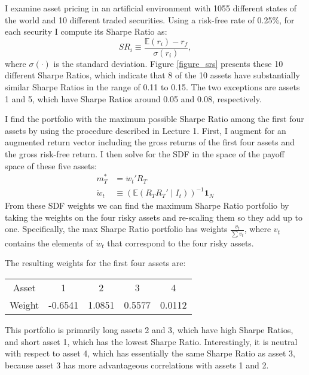 \documentclass[12pt]{article}
\newcommand{\E}{\mathbb{E}}
\begin{document}
\clearpage
{}


I examine asset pricing in an artificial environment with 1055 different states of the world and 10 different traded securities. Using a risk-free rate of 0.25\%, for each security I compute its Sharpe Ratio as:
$$SR_i \equiv \frac{\E(r_i) - r_f}{\sigma(r_i)},$$
where $\sigma(\cdot)$ is the standard deviation. Figure \ref{figure_srs} presents these 10 different Sharpe Ratios, which indicate that 8 of the 10 assets have substantially similar Sharpe Ratios in the range of 0.11 to 0.15. The two exceptions are assets 1 and 5, which have Sharpe Ratios around 0.05 and 0.08, respectively.


I find the portfolio with the maximum possible Sharpe Ratio among the first four assets by using the procedure described in Lecture 1. First, I augment for an augmented return vector including the gross returns of the first four assets and the gross risk-free return. I then solve for the SDF in the space of the payoff space of these five assets:
\begin{align*}
m_T^* &= \dot{w}_t' R_T \\
\dot{w}_t &\equiv \left( \mathbb{E} \left( R_T R_T' \mid I_t \right) \right)^{-1} \mathbf{1}_N
\end{align*}
From these SDF weights we can find the maximum Sharpe Ratio portfolio by taking the weights on the four risky assets and re-scaling them so they add up to one. Specifically, the max Sharpe Ratio portfolio has weights $\frac{v_t}{\sum v_t}$, where $v_t$ contains the elements of $\dot{w}_t$ that correspond to the four risky assets.

The resulting weights for the first four assets are:

\singlespacing
\begin{center}
\begin{tabular}{ccccc}
\hline
\hline
Asset & 1 & 2 & 3 & 4 \bigstrut[t] \\
Weight & -0.6541 & 1.0851 & 0.5577 & 0.0112 \bigstrut[b] \\
\hline
\hline
\end{tabular}
\end{center}

\doublespacing
This portfolio is primarily long assets 2 and 3, which have high Sharpe Ratios, and short asset 1, which has the lowest Sharpe Ratio. Interestingly, it is neutral with respect to asset 4, which has essentially the same Sharpe Ratio as asset 3, because asset 3 has more advantageous correlations with assets 1 and 2.
\end{document}
